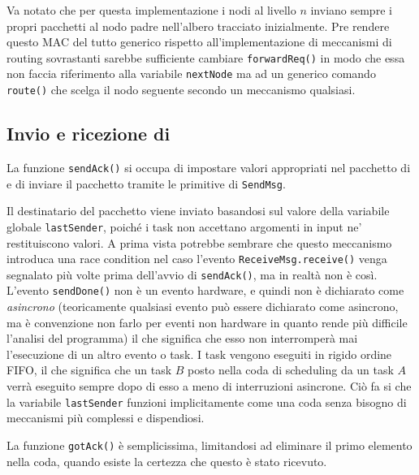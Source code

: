 \documentclass[twoside,11pt,a4paper,italian,openany]{book}
\begin{document}
Va notato che per questa implementazione i nodi al livello $n$ inviano sempre i propri 
pacchetti al nodo padre nell'albero tracciato inizialmente. 
Pre rendere questo MAC del tutto generico rispetto all'implementazione di meccanismi di 
routing sovrastanti sarebbe sufficiente cambiare \texttt{forwardReq()} in modo che essa 
non faccia riferimento alla variabile  \texttt{nextNode} ma ad un generico comando 
\texttt{route()} che scelga il nodo seguente secondo un meccanismo qualsiasi.  

\subsection{Invio e ricezione di \ack}
La funzione \texttt{sendAck()} si occupa di impostare valori appropriati nel pacchetto di \ack 
e di inviare il pacchetto tramite le primitive di \texttt{SendMsg}. 

Il destinatario del pacchetto \ack viene inviato basandosi sul valore della variabile 
globale \texttt{lastSender}, poiché i task non accettano argomenti in input ne' 
restituiscono valori. 
A prima vista potrebbe sembrare che questo meccanismo introduca una race condition nel 
caso l'evento \texttt{ReceiveMsg.receive()} venga segnalato più volte prima dell'avvio 
di \texttt{sendAck()},
ma in realtà non è così. L'evento \texttt{sendDone()} non è un evento hardware, e quindi non 
è dichiarato come \emph{asincrono} (teoricamente qualsiasi evento può essere dichiarato come asincrono, ma è convenzione non farlo per eventi non hardware in quanto rende più difficile l'analisi del programma) il che significa che esso non interromperà mai l'esecuzione di un altro evento o task. 
I task vengono eseguiti in rigido ordine FIFO, il che significa che un task $B$ posto nella coda
di scheduling da un task $A$ verrà eseguito sempre dopo di esso a meno di interruzioni asincrone.
Ciò fa si che la variabile \texttt{lastSender} funzioni implicitamente come una coda senza 
bisogno di meccanismi più complessi e dispendiosi. 

La funzione \texttt{gotAck()} è semplicissima, limitandosi ad eliminare il primo elemento 
nella coda, quando esiste la certezza che questo è stato ricevuto. 
\end{document}
